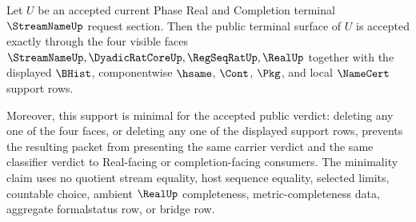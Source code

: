 \begin{theorem}
\label{thm:streamname-terminal-four-face-support-minimality}
Let $U$ be an accepted current Phase Real and Completion terminal
$\StreamNameUp$ request section. Then the public terminal surface of $U$ is
accepted exactly through the four visible faces
$\StreamNameUp,\DyadicRatCoreUp,\RegSeqRatUp,\RealUp$ together with the
displayed $\BHist$, componentwise $\hsame$, $\Cont$, $\Pkg$, and local
$\NameCert$ support rows.

Moreover, this support is minimal for the accepted public verdict: deleting any
one of the four faces, or deleting any one of the displayed support rows,
prevents the resulting packet from presenting the same carrier verdict and the
same classifier verdict to Real-facing or completion-facing consumers. The
minimality claim uses no quotient stream equality, host sequence equality,
selected limits, countable choice, ambient $\RealUp$ completeness,
metric-completeness data, aggregate formalstatus row, or bridge row.
\end{theorem}
